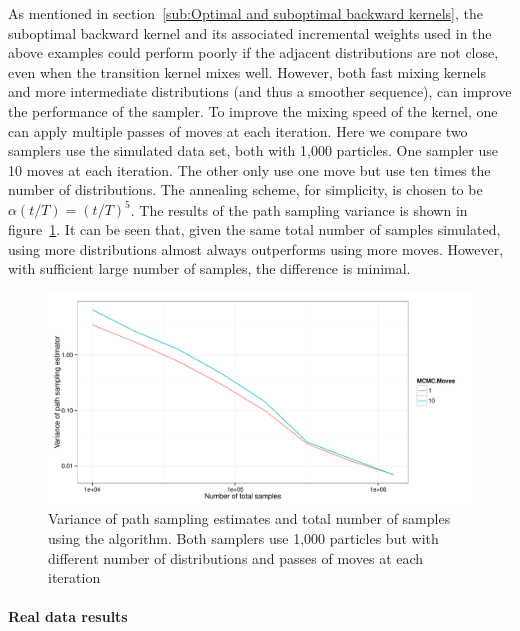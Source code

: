 As mentioned in section~\ref{sub:Optimal and suboptimal backward kernels}, the
suboptimal backward kernel and its associated incremental weights used in the
above examples could perform poorly if the adjacent distributions are not
close, even when the transition kernel mixes well. However, both fast mixing
kernels and more intermediate distributions (and thus a smoother sequence),
can improve the performance of the sampler. To improve the mixing speed of the
kernel, one can apply multiple passes of \mcmc moves at each iteration. Here
we compare two samplers use the simulated data set, both with 1,000 particles.
One sampler use 10 \mcmc moves at each iteration. The other only use one \mcmc
move but use ten times the number of distributions. The annealing scheme, for
simplicity, is chosen to be $\alpha(t/T) = (t/T)^5$. The results of the path
sampling variance is shown in figure~\ref{fig:fast mcmc iter}. It can be seen
that, given the same total number of samples simulated, using more
distributions almost always outperforms using more \mcmc moves. However, with
sufficient large number of samples, the difference is minimal.

\begin{figure}[t]
  \includegraphics[width=\linewidth]{fig/MCMC_Iter_Var}
  \caption{Variance of path sampling estimates and total number of samples
    using the \smc[2] algorithm. Both samplers use 1,000 particles but with
    different number of distributions and passes of \mcmc moves at each
    iteration}
  \label{fig:fast mcmc iter}
\end{figure}

\paragraph{Real data results}

